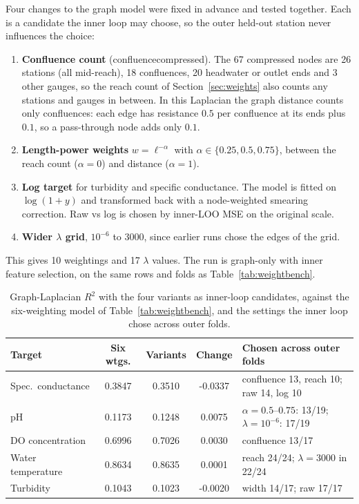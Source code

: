 \documentclass[11pt]{article}
\newcommand{\codeus}{\textunderscore\allowbreak}
\newcommand{\code}[1]{{\ttfamily\let\_\codeus #1}}
\begin{document}
Four changes to the graph model were fixed in advance and tested together. Each is a candidate the
inner loop may choose, so the outer held-out station never influences the choice:
\begin{enumerate}
  \item \textbf{Confluence count} (\code{confluence\_compressed}). The 67 compressed nodes are 26
        stations (all mid-reach), 18 confluences, 20 headwater or outlet ends and 3 other gauges, so
        the reach count of Section~\ref{sec:weights} also counts any stations and gauges in between.
        In this Laplacian the graph distance counts only confluences: each edge has resistance $0.5$
        per confluence at its ends plus $0.1$, so a pass-through node adds only $0.1$.
  \item \textbf{Length-power weights} $w=\ell^{-\alpha}$ with $\alpha\in\{0.25, 0.5, 0.75\}$, between
        the reach count ($\alpha=0$) and distance ($\alpha=1$).
  \item \textbf{Log target} for turbidity and specific conductance. The model is fitted on
        $\log(1+y)$ and transformed back with a node-weighted smearing correction. Raw vs log is
        chosen by inner-LOO MSE on the original scale.
  \item \textbf{Wider $\lambda$ grid}, $10^{-6}$ to 3000, since earlier runs chose the edges of the
        grid.
\end{enumerate}
This gives 10 weightings and 17 $\lambda$ values. The run is graph-only with inner feature selection,
on the same rows and folds as Table~\ref{tab:weightbench}.

\begin{table}[h]
\centering
\small
\caption{Graph-Laplacian $R^2$ with the four variants as inner-loop candidates, against the six-weighting
model of Table~\ref{tab:weightbench}, and the settings the inner loop chose across outer folds.}
\label{tab:variants}
\begin{tabular}{l S S S l}
\toprule
Target & {Six wtgs.} & {Variants} & {Change} & Chosen across outer folds \\
\midrule
Spec.\ conductance   & 0.3847 & 0.3510 & -0.0337 & confluence 13, reach 10; raw 14, log 10 \\
pH                   & 0.1173 & 0.1248 & 0.0075  & $\alpha=0.5$--$0.75$: 13/19; $\lambda=10^{-6}$: 17/19 \\
DO concentration     & 0.6996 & 0.7026 & 0.0030  & confluence 13/17 \\
Water temperature    & 0.8634 & 0.8635 & 0.0001  & reach 24/24; $\lambda=3000$ in 22/24 \\
Turbidity            & 0.1043 & 0.1023 & -0.0020 & width 14/17; raw 17/17 \\
\bottomrule
\end{tabular}
\end{table}
\end{document}
